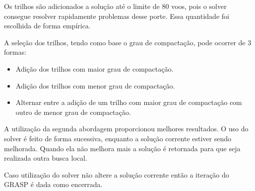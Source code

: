 	Os trilhos são adicionados a solução até o limite de 80 voos, pois o solver consegue resolver rapidamente problemas desse porte. Essa quantidade foi escolhida de forma empírica.
	
	A seleção dos trilhos, tendo como base o grau de compactação, pode ocorrer de 3 formas:
	
	\begin{itemize}
\item Adição dos trilhos com maior grau de compactação.
\item Adição dos trilhos com menor grau de compactação.
\item Alternar entre a adição de um trilho com maior grau de compactação com outro de menor grau de compactação.
\end{itemize}
 
 A utilização da segunda abordagem proporcionou melhores resultados. O uso do solver é feito de forma sucessiva, enquanto a solução corrente estiver sendo melhorada. Quando ela não melhora mais a solução é retornada para que seja realizada outra busca local.

Caso utilização do solver não altere a solução corrente então a iteração do GRASP é dada como encerrada.  
 